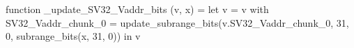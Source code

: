function _update_SV32_Vaddr_bits (v, x) = let v = { v with SV32_Vaddr_chunk_0 = update_subrange_bits(v.SV32_Vaddr_chunk_0, 31, 0, subrange_bits(x, 31, 0)) } in
  v
